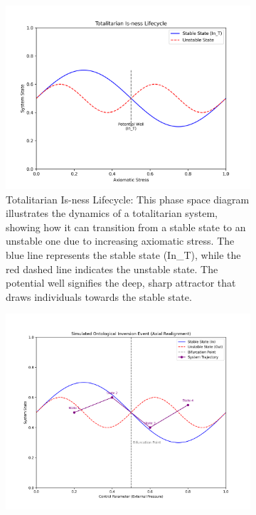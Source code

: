 \documentclass{article}
\begin{document}
\begin{figure}[htbp]
    \centering
    \begin{subfigure}[b]{0.65\textwidth}
        \centering
        \includegraphics[width=\textwidth]{figures/ani_Totalitarian-Lifecycle.png}
        \caption{Totalitarian Is-ness Lifecycle: This phase space diagram illustrates the dynamics of a totalitarian system, showing how it can transition from a stable state to an unstable one due to increasing axiomatic stress. The blue line represents the stable state (In\_T), while the red dashed line indicates the unstable state. The potential well signifies the deep, sharp attractor that draws individuals towards the stable state.}
        \label{fig:totalitarian_lifecycle}
    \end{subfigure}
    \hfill
    \begin{subfigure}[b]{0.65\textwidth}
        \centering
        \includegraphics[width=\textwidth]{figures/ani_Ontological_Inversion.png}

\end{subfigure}
\end{figure}
\end{document}
